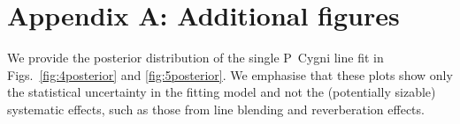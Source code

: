 \documentclass{aa}
\begin{document}










\setcounter{equation}{0}
\setcounter{figure}{0}
\renewcommand{\thefigure}{A.\arabic{figure}}

\section*{Appendix A: Additional figures}
\renewcommand{\thesubsection}{\Alph{subsection}}
We provide the posterior distribution of the single P~Cygni line fit in Figs.~\ref{fig:4posterior} and \ref{fig:5posterior}. We emphasise that these plots show only the statistical uncertainty in the fitting model and not the (potentially sizable) systematic effects, such as those from line blending and reverberation effects.
\end{document}
